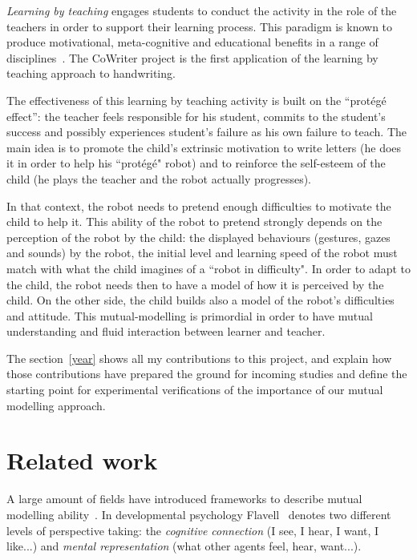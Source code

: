 \documentclass[10pt,a4paper]{article}
\begin{document}
\emph{Learning by teaching} engages students to conduct the activity in the role of the teachers in order to support their learning process. 
This  paradigm is known to produce motivational, meta-cognitive and educational benefits in a range of disciplines~\cite{Rohrbeck2003}. 
The CoWriter project is the first application of the learning by teaching approach to handwriting.

The effectiveness of this learning by teaching activity is built on the ``prot\'eg\'e effect'': the teacher feels responsible for his student, commits to the student's success and possibly experiences student's failure as his own failure to teach. 
The main idea is to promote the child's extrinsic motivation to write letters (he does it in order to help his ``prot\'eg\'e" robot) and to reinforce the self-esteem of the child (he plays the teacher and the robot actually progresses).

In that context, the robot needs to pretend enough difficulties to motivate the child to help it. 
This ability of the robot to pretend strongly depends on the perception of the robot by the child: the displayed behaviours (gestures, gazes and sounds) by the robot, the initial level and learning speed of the robot must match with what the child imagines of a ``robot in difficulty".
In order to adapt to the child, the robot needs then to have a model of how it is perceived by the child. On the other side, the child builds also a model of the robot's difficulties and attitude. 
This mutual-modelling is primordial in order to have mutual understanding and fluid interaction between learner and teacher. 

The section~\ref{year} shows all my contributions to this project, and explain how those contributions have prepared the ground for incoming studies and define the starting point for experimental verifications of the importance of our mutual modelling approach.

\section{Related work}\label{rw}


A large amount of fields have introduced frameworks to describe mutual modelling ability~\cite{lemaignan2015mutual}. 
In developmental psychology Flavell~\cite{flavell1990developmental} denotes two different levels of perspective taking: the \textit{cognitive connection} (I see, I hear, I want, I like...) and \textit{mental representation} (what other agents feel, hear, want...).
\end{document}
